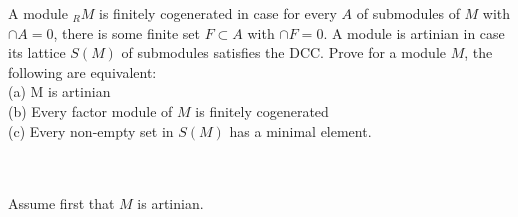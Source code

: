 A module $_RM$ is finitely cogenerated in case for every $A$ of submodules of $M$ with $\cap A=0$, there
is some finite set $F\subset A$ with $\cap F=0$. A module is artinian in case its lattice $S(M)$ of
submodules satisfies the DCC. Prove for a module $M$, the following are equivalent:\\
(a) M is artinian\\
(b) Every factor module of $M$ is finitely cogenerated\\
(c) Every non-empty set in $S(M)$ has a minimal element.\\\\

\begin{solution}\renewcommand{\qedsymbol}{}\ \\
    
    Assume first that $M$ is artinian.

\end{solution}